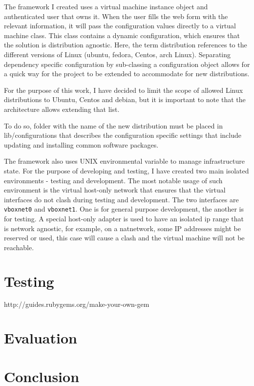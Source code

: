 \documentclass{article}
\begin{document}
The framework I created uses a virtual machine instance object and authenticated user that owns it. When the user fills the web form with the relevant information, it will pass the configuration values directly to a virtual machine class. This class contains a dynamic configuration, which ensures that the solution is distribution agnostic. Here, the term distribution references to the different versions of Linux (ubuntu, fedora, Centos, arch Linux). Separating dependency specific configuration by sub-classing a configuration object allows for a quick way for the project to be extended to accommodate for new distributions.

For the purpose of this work, I have decided to limit the scope of allowed Linux distributions to Ubuntu, Centos and debian, but it is important to note that the architecture allows extending that list.

To do so, folder with the name of the new distribution must be placed in lib/configurations that describes the configuration specific settings that include updating and installing common software packages.

The framework also uses UNIX environmental variable to manage infrastructure state. For the  purpose of developing and testing, I have created two main isolated environments - testing and development.
The most notable usage of such environment is the virtual host-only network that ensures that the virtual interfaces do not clash during testing and development. The two interfaces are \texttt{vboxnet0} and \texttt{vboxnet1}. One is for general purpose development, the another is for testing. A special host-only adapter is used to have an isolated ip range that is network agnostic, for example, on a \gls{natnetwork}, some IP addresses might be reserved or used, this case will cause a clash and the virtual machine will not be reachable.

\newpage


\newpage
\section{Testing}

http://guides.rubygems.org/make-your-own-gem

\newpage
\section{Evaluation}

\newpage
\section{Conclusion}
\end{document}

